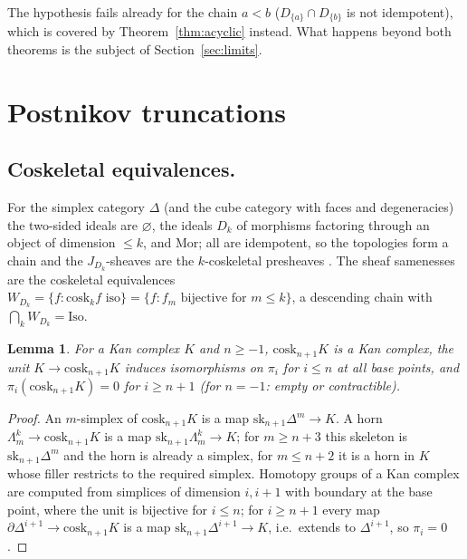 \documentclass[11pt]{amsart}
\newtheorem{lem}[thm]{Lemma}
\theoremstyle{definition}
\newcommand{\Mor}{\mathrm{Mor}}
\newcommand{\Iso}{\mathrm{Iso}}
\newcommand{\cosk}{\mathrm{cosk}}
\newcommand{\sk}{\mathrm{sk}}
\begin{document}
The hypothesis fails already for the chain $a<b$ ($D_{\{a\}}\cap D_{\{b\}}$ is not
idempotent), which is covered by Theorem~\ref{thm:acyclic} instead. What
happens beyond both theorems is the subject of Section~\ref{sec:limits}.

\section{Postnikov truncations}\label{sec:homotopy}

\subsection{Coskeletal equivalences.}
For the simplex category $\Delta$ (and the cube category with faces and
degeneracies) the two-sided ideals are $\varnothing$, the ideals $D_k$ of
morphisms factoring through an object of dimension $\le k$, and $\Mor$; all are
idempotent, so the topologies form a chain and the $J_{D_k}$-sheaves are the
$k$-coskeletal presheaves \cite[Thm.~6.1]{Postnikov}. The sheaf samenesses are
the coskeletal equivalences
$W_{D_k}=\{f:\cosk_kf\text{ iso}\}=\{f: f_m\text{ bijective for }m\le k\}$,
a descending chain with $\bigcap_kW_{D_k}=\Iso$.

\begin{lem}\label{lem:cosk}
For a Kan complex $K$ and $n\ge-1$, $\cosk_{n+1}K$ is a Kan complex, the unit
$K\to\cosk_{n+1}K$ induces isomorphisms on $\pi_i$ for $i\le n$ at all base
points, and $\pi_i(\cosk_{n+1}K)=0$ for $i\ge n+1$ (for $n=-1$: empty or
contractible).
\end{lem}
\begin{proof}
An $m$-simplex of $\cosk_{n+1}K$ is a map $\sk_{n+1}\Delta^m\to K$. A horn
$\Lambda^k_m\to\cosk_{n+1}K$ is a map $\sk_{n+1}\Lambda^k_m\to K$; for $m\ge n+3$
this skeleton is $\sk_{n+1}\Delta^m$ and the horn is already a simplex, for
$m\le n+2$ it is a horn in $K$ whose filler restricts to the required simplex.
Homotopy groups of a Kan complex are computed from simplices of dimension
$i,i+1$ with boundary at the base point, where the unit is bijective for
$i\le n$; for $i\ge n+1$ every map $\partial\Delta^{i+1}\to\cosk_{n+1}K$ is a map
$\sk_{n+1}\Delta^{i+1}\to K$, i.e.\ extends to $\Delta^{i+1}$, so $\pi_i=0$.
\end{proof}
\end{document}
